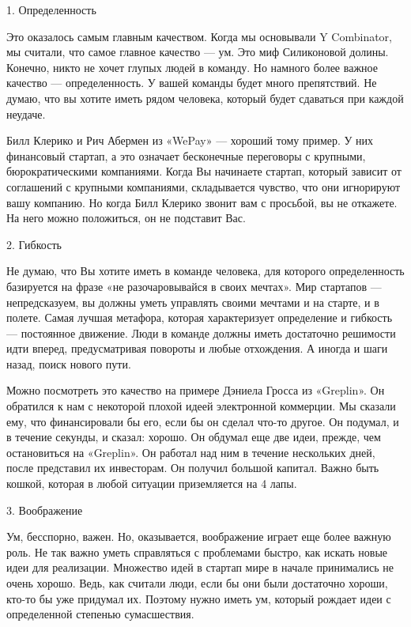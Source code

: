 \documentclass[ebook,12pt,oneside,openany]{memoir}
\begin{document}
\maketitle

1. Определенность

Это оказалось самым главным качеством. Когда мы основывали Y
Combinator, мы считали, что самое главное качество — ум. Это миф
Силиконовой долины. Конечно, никто не хочет глупых людей в команду. Но
намного более важное качество — определенность. У вашей команды будет
много препятствий. Не думаю, что вы хотите иметь рядом человека,
который будет сдаваться при каждой неудаче.

Билл Клерико и Рич Абермен из «WePay» — хороший тому пример. У них
финансовый стартап, а это означает бесконечные переговоры с крупными,
бюрократическими компаниями. Когда Вы начинаете стартап, который
зависит от соглашений с крупными компаниями, складывается чувство, что
они игнорируют вашу компанию. Но когда Билл Клерико звонит вам с
просьбой, вы не откажете. На него можно положиться, он не подставит
Вас.

2. Гибкость

Не думаю, что Вы хотите иметь в команде человека, для которого
определенность базируется на фразе «не разочаровывайся в своих
мечтах». Мир стартапов — непредсказуем, вы должны уметь управлять
своими мечтами и на старте, и в полете. Самая лучшая метафора, которая
характеризует определение и гибкость — постоянное движение. Люди в
команде должны иметь достаточно решимости идти вперед, предусматривая
повороты и любые отхождения. А иногда и шаги назад, поиск нового пути.

Можно посмотреть это качество на примере Дэниела Гросса из «Greplin».
Он обратился к нам с некоторой плохой идеей электронной коммерции. Мы
сказали ему, что финансировали бы его, если бы он сделал что-то
другое. Он подумал, и в течение секунды, и сказал: хорошо. Он обдумал
еще две идеи, прежде, чем остановиться на «Greplin». Он работал над
ним в течение нескольких дней, после представил их инвесторам. Он
получил большой капитал. Важно быть кошкой, которая в любой ситуации
приземляется на 4 лапы.

3. Воображение

Ум, бесспорно, важен. Но, оказывается, воображение играет еще более
важную роль. Не так важно уметь справляться с проблемами быстро, как
искать новые идеи для реализации. Множество идей в стартап мире в
начале принимались не очень хорошо. Ведь, как считали люди, если бы
они были достаточно хороши, кто-то бы уже придумал их. Поэтому нужно
иметь ум, который рождает идеи с определенной степенью сумасшествия.
\end{document}

